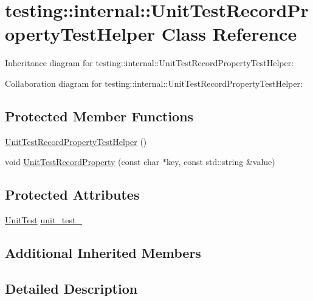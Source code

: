 \hypertarget{classtesting_1_1internal_1_1_unit_test_record_property_test_helper}{}\section{testing\+:\+:internal\+:\+:Unit\+Test\+Record\+Property\+Test\+Helper Class Reference}
\label{classtesting_1_1internal_1_1_unit_test_record_property_test_helper}


Inheritance diagram for testing\+:\+:internal\+:\+:Unit\+Test\+Record\+Property\+Test\+Helper\+:


Collaboration diagram for testing\+:\+:internal\+:\+:Unit\+Test\+Record\+Property\+Test\+Helper\+:
\subsection*{Protected Member Functions}
\begin{DoxyCompactItemize}
\item 
\hyperlink{classtesting_1_1internal_1_1_unit_test_record_property_test_helper_aa2bdfe52eb2aab5233ce9118917a4750}{Unit\+Test\+Record\+Property\+Test\+Helper} ()
\item 
void \hyperlink{classtesting_1_1internal_1_1_unit_test_record_property_test_helper_a9c5432d080faf13a1db6baff0a2944f4}{Unit\+Test\+Record\+Property} (const char $\ast$key, const std\+::string \&value)
\end{DoxyCompactItemize}
\subsection*{Protected Attributes}
\begin{DoxyCompactItemize}
\item 
\hyperlink{classtesting_1_1_unit_test}{Unit\+Test} \hyperlink{classtesting_1_1internal_1_1_unit_test_record_property_test_helper_a415e13a354d3b8bd97db96aae5ef5df1}{unit\+\_\+test\+\_\+}
\end{DoxyCompactItemize}
\subsection*{Additional Inherited Members}


\subsection{Detailed Description}


